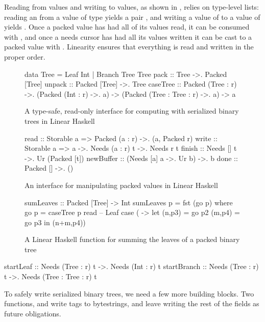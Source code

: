 Reading from  values and writing to  values, as shown in
, relies on type-level lists: reading an  from
a value of type  yields a pair ,
and writing a value of  to a value of  yields
. Once a packed value has had all of its values read, it can
be consumed with , and once a needs cursor has had all its values
written it can be cast to a packed value with . Linearity
ensures that everything is read and written in the proper order.

\begin{figure}
\begin{code}
data Tree = Leaf Int | Branch Tree Tree
pack :: Tree ->. Packed [Tree]
unpack :: Packed [Tree] ->. Tree
caseTree :: Packed (Tree : r) ->.
            (Packed (Int : r) ->. a) ->
            (Packed (Tree : Tree : r) ->. a) -> a
\end{code}
\caption{A type-safe, read-only interface for computing with serialized binary trees
  in Linear Haskell}
\label{fig:linpacktree}
\end{figure}
\begin{figure}
\begin{code}
read :: Storable a => Packed (a : r) ->. (a, Packed r)
write :: Storable a => a ->. Needs (a : r) t ->. Needs r t
finish :: Needs [] t ->. Ur (Packed [t])
newBuffer :: (Needs [a] a ->. Ur b) ->. b
done :: Packed [] ->. ()
\end{code}
\caption{An interface for manipulating packed values in Linear Haskell}
\label{fig:lininterface}
\end{figure}
\begin{figure}
\begin{code}
sumLeaves :: Packed [Tree] -> Int
sumLeaves p = fst (go p)
  where go p = caseTree p
           read -- Leaf case
           ( -> let (n,p3) = go p2
                       (m,p4) = go p3
                   in (n+m,p4))
\end{code}
\caption{A Linear Haskell function for summing the leaves of a packed
  binary tree}
\label{fig:linsumleaves}
\end{figure}

\begin{code}
startLeaf :: Needs (Tree : r) t ->. Needs (Int : r) t
startBranch :: Needs (Tree : r) t ->. Needs (Tree : Tree : r) t
\end{code}
%
To safely write serialized binary trees, we need a few more building blocks.
Two functions,  and  write
tags to bytestrings, and leave writing the rest of the fields as future
obligations.


